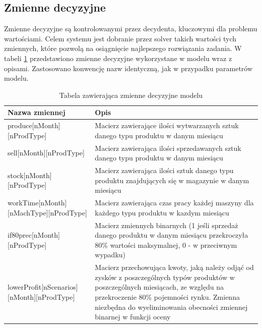 \documentclass[11pt,a4paper]{article}
\begin{document}
\subsection{Zmienne decyzyjne}
Zmienne decyzyjne są kontrolowanymi przez decydenta, kluczowymi dla problemu wartościami. Celem systemu jest dobranie przez solver takich wartości tych zmiennych, które pozwolą na osiągnięcie najlepszego rozwiązania zadania. W tabeli \ref{tab:var} przedstawiono zmienne decyzyjne wykorzystane w modelu wraz z opisami. Zastosowano konwencję nazw identyczną, jak w przypadku parametrów modelu.

\begin{table}[ht!]
\caption{Tabela zawierająca zmienne decyzyjne modelu}
\label{tab:var}
\begin{tabular}{lp{7.5cm}}
	\hline
	Nazwa zmiennej      & Opis \\
	\hline
	produce[nMonth][nProdType] & Macierz zawierające ilości wytwarzanych sztuk danego typu produktu w danym miesiącu \\
	sell[nMonth][nProdType] & Macierz zawierająca ilości sprzedawanych sztuk danego typu produktu w danym miesiącu \\
	stock[nMonth][nProdType] & Macierz zawierająca ilości sztuk danego typu produktu znajdujących się w magazynie w danym miesiącu \\
	workTime[nMonth][nMachType][nProdType] & Macierz zawierająca czas pracy każdej maszyny dla każdego typu produktu w kazdym miesiącu \\
	if80prec[nMonth][nProdType] & Macierz zmiennych binarnych (1 jeśli sprzedaż danego produktu w danym miesiącu przekroczyła 80\% wartości maksymalnej, 0 - w przeciwnym wypadku)\\
	lowerProfit[nScenarios][nMonth][nProdType] & Macierz przechowująca kwoty, jaką należy odjąć od zysków z poszczególnych typów produktów w poszczególnych miesiącach, ze względu na przekroczenie 80\% pojemności rynku. Zmienna niezbędna do wyeliminowania obecności zmiennej binarnej w funkcji oceny\\
	\hline
\end{tabular}
\end{table}
\end{document}
